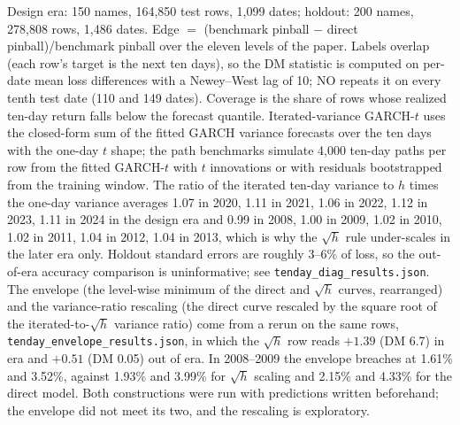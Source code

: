 \documentclass[11pt]{article}
\begin{document}
\begin{table}[htbp]
\begin{threeparttable}
\begin{tablenotes}
\item Design era: 150 names, 164,850 test rows, 1,099 dates; holdout: 200 names, 278,808 rows, 1,486 dates. Edge $=$ (benchmark pinball $-$ direct pinball)/benchmark pinball over the eleven levels of the paper. Labels overlap (each row's target is the next ten days), so the DM statistic is computed on per-date mean loss differences with a Newey--West lag of 10; NO repeats it on every tenth test date (110 and 149 dates). Coverage is the share of rows whose realized ten-day return falls below the forecast quantile. Iterated-variance GARCH-$t$ uses the closed-form sum of the fitted GARCH variance forecasts over the ten days with the one-day $t$ shape; the path benchmarks simulate 4,000 ten-day paths per row from the fitted GARCH-$t$ with $t$ innovations or with residuals bootstrapped from the training window. The ratio of the iterated ten-day variance to $h$ times the one-day variance averages 1.07 in 2020, 1.11 in 2021, 1.06 in 2022, 1.12 in 2023, 1.11 in 2024 in the design era and 0.99 in 2008, 1.00 in 2009, 1.02 in 2010, 1.02 in 2011, 1.04 in 2012, 1.04 in 2013, which is why the $\sqrt{h}$ rule under-scales in the later era only. Holdout standard errors are roughly 3--6\% of loss, so the out-of-era accuracy comparison is uninformative; see \texttt{tenday\_diag\_results.json}. The envelope (the level-wise minimum of the direct and $\sqrt{h}$ curves, rearranged) and the variance-ratio rescaling (the direct curve rescaled by the square root of the iterated-to-$\sqrt{h}$ variance ratio) come from a rerun on the same rows, \texttt{tenday\_envelope\_results.json}, in which the $\sqrt{h}$ row reads $+1.39$ (DM 6.7) in era and $+0.51$ (DM 0.05) out of era. In 2008--2009 the envelope breaches at 1.61\% and 3.52\%, against 1.93\% and 3.99\% for $\sqrt{h}$ scaling and 2.15\% and 4.33\% for the direct model. Both constructions were run with predictions written beforehand; the envelope did not meet its two, and the rescaling is exploratory.
\end{tablenotes}
\end{threeparttable}
\end{table}
\end{document}
